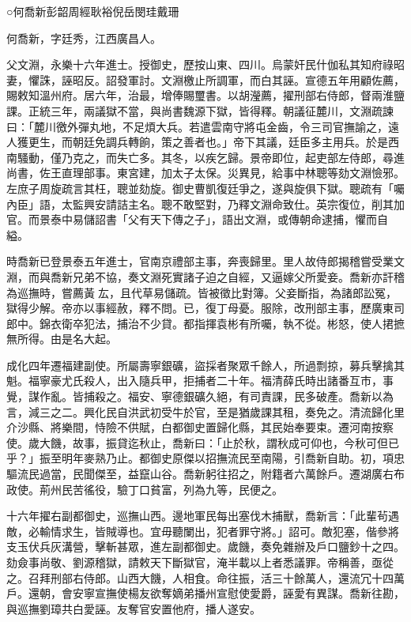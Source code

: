 
\begin{pinyinscope}
○何喬新彭韶周經耿裕倪岳閔珪戴珊

何喬新，字廷秀，江西廣昌人。

父文淵，永樂十六年進士。授御史，歷按山東、四川。烏蒙奸民什伽私其知府祿昭妻，懼誅，誣昭反。詔發軍討。文淵檄止所調軍，而白其誣。宣德五年用顧佐薦，賜敕知溫州府。居六年，治最，增俸賜璽書。以胡瀅薦，擢刑部右侍郎，督兩淮鹽課。正統三年，兩議獄不當，與尚書魏源下獄，皆得釋。朝議征麓川，文淵疏諫曰：「麓川徼外彈丸地，不足煩大兵。若遣雲南守將屯金齒，令三司官撫諭之，遠人獲更生，而朝廷免調兵轉餉，策之善者也。」帝下其議，廷臣多主用兵。於是西南騷動，僅乃克之，而失亡多。其冬，以疾乞歸。景帝即位，起吏部左侍郎，尋進尚書，佐王直理部事。東宮建，加太子太保。災異見，給事中林聰等劾文淵憸邪。左庶子周旋疏言其枉，聰並劾旋。御史曹凱復廷爭之，遂與旋俱下獄。聰疏有「囑內臣」語，太監興安請詰主名。聰不敢堅對，乃釋文淵命致仕。英宗復位，削其加官。而景泰中易儲詔書「父有天下傳之子」，語出文淵，或傳朝命逮捕，懼而自縊。

時喬新已登景泰五年進士，官南京禮部主事，奔喪歸里。里人故侍郎揭稽嘗受業文淵，而與喬新兄弟不協，奏文淵死實諸子迫之自經，又逼嫁父所愛妾。喬新亦訐稽為巡撫時，嘗薦黃厷，且代草易儲疏。皆被徵比對簿。父妾斷指，為諸郎訟冤，獄得少解。帝亦以事經赦，釋不問。已，復丁母憂。服除，改刑部主事，歷廣東司郎中。錦衣衛卒犯法，捕治不少貸。都指揮袁彬有所囑，執不從。彬怒，使人捃摭無所得。由是名大起。

成化四年遷福建副使。所屬壽寧銀礦，盜採者聚眾千餘人，所過剽掠，募兵擊擒其魁。福寧豪尤氏殺人，出入隨兵甲，拒捕者二十年。福清薛氏時出諸番互市，事覺，謀作亂。皆捕殺之。福安、寧德銀礦久絕，有司責課，民多破產。喬新以為言，減三之二。興化民自洪武初受牛於官，至是猶歲課其租，奏免之。清流歸化里介沙縣、將樂間，恃險不供賦，白都御史置歸化縣，其民始奉要束。遷河南按察使。歲大饑，故事，振貸迄秋止，喬新曰：「止於秋，謂秋成可仰也，今秋可但已乎？」振至明年麥熟乃止。都御史原傑以招撫流民至南陽，引喬新自助。初，項忠驅流民過當，民聞傑至，益竄山谷。喬新躬往招之，附籍者六萬餘戶。遷湖廣右布政使。荊州民苦徭役，驗丁口貧富，列為九等，民便之。

十六年擢右副都御史，巡撫山西。邊地軍民每出塞伐木捕獸，喬新言：「此輩茍遇敵，必輸情求生，皆賊導也。宜毋聽闌出，犯者罪守將。」詔可。敵犯塞，偕參將支玉伏兵灰溝營，擊斬甚眾，進左副都御史。歲饑，奏免雜辦及戶口鹽鈔十之四。劾僉事尚敬、劉源稽獄，請敕天下斷獄官，淹半載以上者悉議罪。帝稱善，亟從之。召拜刑部右侍郎。山西大饑，人相食。命往振，活三十餘萬人，還流冗十四萬戶。還朝，會安寧宣撫使楊友欲奪嫡弟播州宣慰使愛爵，誣愛有異謀。喬新往勘，與巡撫劉璋共白愛誣。友奪官安置他府，播人遂安。


\end{pinyinscope}
